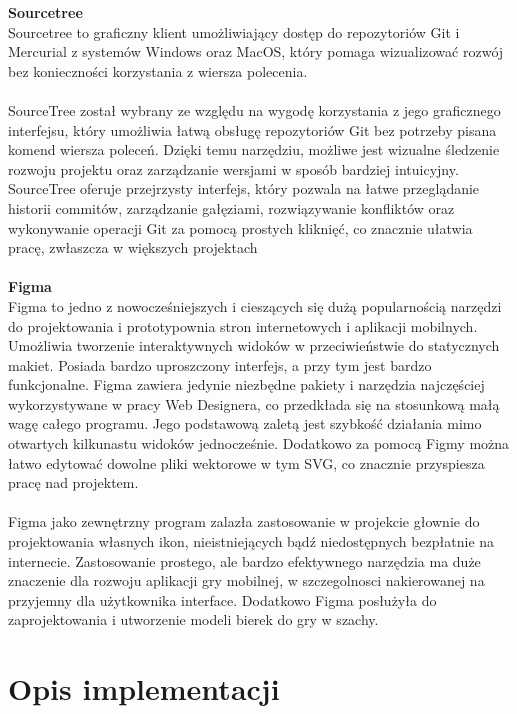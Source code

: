 \documentclass[twoside]{projektInzynierskiMS1}
\begin{document}
\noindent \textbf{Sourcetree}\\
Sourcetree to graficzny klient umożliwiający dostęp do repozytoriów Git i Mercurial z systemów Windows oraz MacOS, który pomaga wizualizować rozwój bez konieczności korzystania z wiersza polecenia.
\\\\
SourceTree został wybrany ze względu na wygodę korzystania z jego graficznego interfejsu, który umożliwia łatwą obsługę repozytoriów Git bez potrzeby pisana komend wiersza poleceń. Dzięki temu narzędziu, możliwe jest wizualne śledzenie rozwoju projektu oraz zarządzanie wersjami w sposób bardziej intuicyjny. SourceTree oferuje przejrzysty interfejs, który pozwala na łatwe przeglądanie historii commitów, zarządzanie gałęziami, rozwiązywanie konfliktów oraz wykonywanie operacji Git za pomocą prostych kliknięć, co znacznie ułatwia pracę, zwłaszcza w większych projektach
\\\\

\noindent \textbf{Figma}\\
Figma to jedno z nowocześniejszych i cieszących się dużą popularnością narzędzi do projektowania i prototypownia stron internetowych i aplikacji mobilnych. Umożliwia tworzenie interaktywnych widoków w przeciwieństwie do statycznych makiet. Posiada bardzo uproszczony interfejs, a przy tym jest bardzo funkcjonalne. Figma zawiera jedynie niezbędne pakiety i narzędzia najczęściej wykorzystywane w pracy Web Designera, co przedkłada się na stosunkową małą wagę całego programu. Jego podstawową zaletą jest szybkość działania mimo otwartych kilkunastu widoków jednocześnie. Dodatkowo za pomocą Figmy można łatwo edytować dowolne pliki wektorowe w tym SVG, co znacznie przyspiesza pracę nad projektem.
\\\\
Figma jako zewnętrzny program zalazła zastosowanie w projekcie głownie do projektowania własnych ikon, nieistniejących bądź niedostępnych bezpłatnie na internecie. Zastosowanie prostego, ale bardzo efektywnego narzędzia ma duże znaczenie dla rozwoju aplikacji gry mobilnej, w szczegolnosci nakierowanej na przyjemny dla użytkownika interface. Dodatkowo Figma posłużyła do zaprojektowania i utworzenie modeli bierek do gry w szachy.  

\newpage

\section{Opis implementacji}
\end{document}
